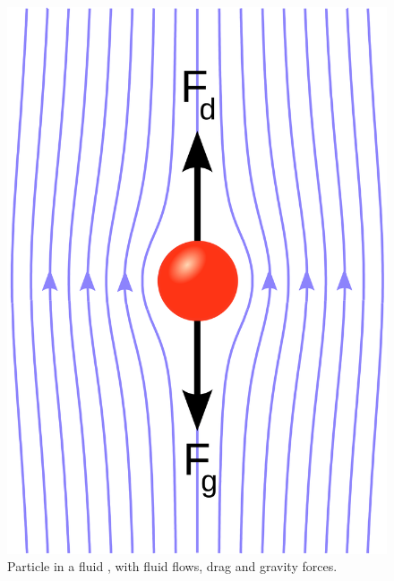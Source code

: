 \begin{figure}[!htb]
\centering
\includegraphics[width=.30\columnwidth]{images/131stokessphere}
\caption[Particle in a fluid]{Particle in a fluid \cite{RefWorks:37}, with
fluid flows, drag and gravity forces.}
\label{fig:131stokessphere}
\end{figure}